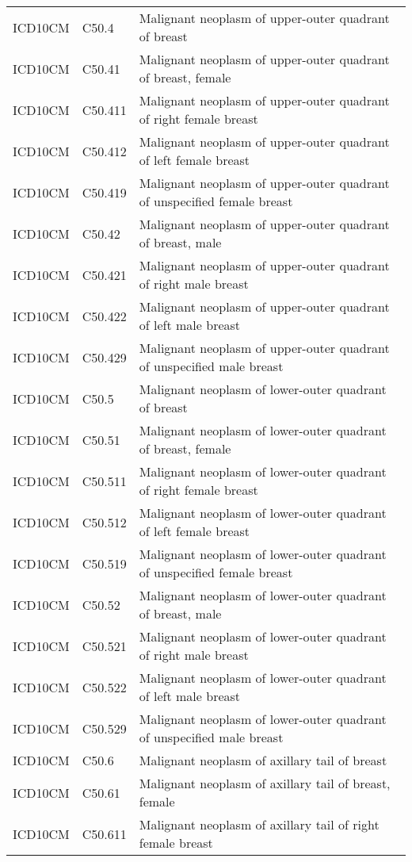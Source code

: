 \begin{longtable}{p{}p{}p{}}
  ICD10CM & C50.4 & Malignant neoplasm of upper-outer quadrant of breast \\ 
  ICD10CM & C50.41 & Malignant neoplasm of upper-outer quadrant of breast, female \\ 
  ICD10CM & C50.411 & Malignant neoplasm of upper-outer quadrant of right female breast \\ 
  ICD10CM & C50.412 & Malignant neoplasm of upper-outer quadrant of left female breast \\ 
  ICD10CM & C50.419 & Malignant neoplasm of upper-outer quadrant of unspecified female breast \\ 
  ICD10CM & C50.42 & Malignant neoplasm of upper-outer quadrant of breast, male \\ 
  ICD10CM & C50.421 & Malignant neoplasm of upper-outer quadrant of right male breast \\ 
  ICD10CM & C50.422 & Malignant neoplasm of upper-outer quadrant of left male breast \\ 
  ICD10CM & C50.429 & Malignant neoplasm of upper-outer quadrant of unspecified male breast \\ 
  ICD10CM & C50.5 & Malignant neoplasm of lower-outer quadrant of breast \\ 
  ICD10CM & C50.51 & Malignant neoplasm of lower-outer quadrant of breast, female \\ 
  ICD10CM & C50.511 & Malignant neoplasm of lower-outer quadrant of right female breast \\ 
  ICD10CM & C50.512 & Malignant neoplasm of lower-outer quadrant of left female breast \\ 
  ICD10CM & C50.519 & Malignant neoplasm of lower-outer quadrant of unspecified female breast \\ 
  ICD10CM & C50.52 & Malignant neoplasm of lower-outer quadrant of breast, male \\ 
  ICD10CM & C50.521 & Malignant neoplasm of lower-outer quadrant of right male breast \\ 
  ICD10CM & C50.522 & Malignant neoplasm of lower-outer quadrant of left male breast \\ 
  ICD10CM & C50.529 & Malignant neoplasm of lower-outer quadrant of unspecified male breast \\ 
  ICD10CM & C50.6 & Malignant neoplasm of axillary tail of breast \\ 
  ICD10CM & C50.61 & Malignant neoplasm of axillary tail of breast, female \\ 
  ICD10CM & C50.611 & Malignant neoplasm of axillary tail of right female breast \\ 

\end{longtable}
